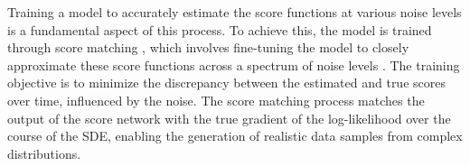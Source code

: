 Training a model to accurately estimate the score functions at various noise levels is a fundamental aspect of this process. To achieve this, the model is trained through score matching \citep{hyvarinenScoreMatching}, which involves fine-tuning the model to closely approximate these score functions across a spectrum of noise levels \citep{song2020score}. The training objective is to minimize the discrepancy between the estimated and true scores over time, influenced by the noise. The score matching process matches the output of the score network with the true gradient of the log-likelihood over the course of the SDE, enabling the generation of realistic data samples from complex distributions.